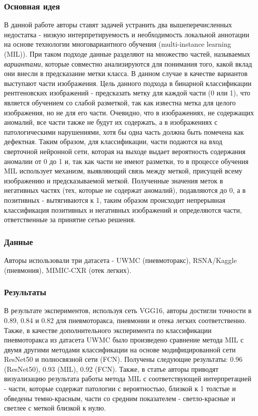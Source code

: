\subsubsection*{Основная идея}
В данной работе \cite{ann2} авторы ставят задачей устранить два вышеперечисленных недостатка - 
низкую интерпретируемость и необходимость локальной аннотации на основе технологии многовариантного 
обучения (multi-instance learning (MIL)). При таком подходе данные разделяют на множество частей, 
называемых \textit{вариантами}, которые совместно анализируются для понимания того, какой вклад они 
внесли в предсказание метки класса. В данном случае в качестве вариантов выступают части изображения. 
Цель данного подхода в бинарной классификации рентгеновских изображений - предсказать метку для каждой части (0 или 1), 
что является обучением со слабой разметкой, так как известна метка для целого изображения, но не для его части.
 Очевидно, что в изображениях, не содержащих аномалий, все части также не будут их содержать, а в изображениях с 
 патологическими нарушениями, хотя бы одна часть должна быть помечена как дефектная. Таким образом, для классификации, 
 части подаются на вход сверточной нейронной сети, которая на выходе выдает вероятность содержания аномалии от 0 до 1 и, 
 так как части не имеют разметки, то в процессе обучения MIL использует механизм, выявляющий связь между меткой, 
 присущей всему изображению и предсказываемой меткой. Полученные значения меток в негативных частях (тех, которые не содержат аномалий), 
 подавляются до 0, а в позитивных - вытягиваются к 1, таким образом происходит непрерывная классификация позитивных и негативных 
 изображений и определяются части, ответственные за принятие сетью решения. \par
\subsubsection*{Данные}
Авторы использовали три датасета - UWMC (пневмоторакс), RSNA/Kaggle (пневмония), MIMIC-CXR (отек легких).\par 

\subsubsection*{Результаты}
В результате экспериментов, используя сеть VGG16\cite{VGG}, авторы достигли точности в 0.89, 0.84 и 0.82 для 
пневмоторакса, пневмонии и отека легких соответственно. Также, в качестве дополнительного эксперимента
 по классификации пневмоторакса из датасета UWMC было произведено сравнение метода MIL 
 с двумя другими методами классификации на основе модифицированной сети ResNet50 и 
 полносвязной сети (FCN). Получены следующие результаты: 0.96 (ResNet50), 0.93 (MIL), 0.92 (FCN). 
 Также, в статье авторы приводят визуализацию результата работы метода MIL с соответствующей интерпретацией - 
 части, которые содержат патологии с вероятностью, близкой к 1 толстые и обведены темно-красным, части со средним показателем - 
 светло-красные и светлее с меткой близкой к нулю. \par
